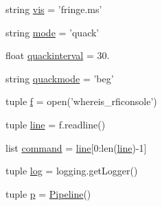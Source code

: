 \begin{DoxyCompactItemize}
\item 
string \hyperlink{namespacepipeline_a0c63f0078f780b925a9ff4e7152fd594}{vis} = 'fringe.\-ms'
\item 
string \hyperlink{namespacepipeline_ab3aedaf24061f05c06f13e3974bb528f}{mode} = 'quack'
\item 
float \hyperlink{namespacepipeline_a79d2ebe895f856da9610081a56d7d7b8}{quackinterval} = 30.
\item 
string \hyperlink{namespacepipeline_a7f4725d9856743ba5e6bf500e4e5ecb0}{quackmode} = 'beg'
\item 
tuple \hyperlink{namespacepipeline_a588e4fbfb4e0417f484202a3b99b6246}{f} = open('whereis\-\_\-rficonsole')
\item 
tuple \hyperlink{namespacepipeline_a4082c06691225d68a0ad3c6c56e73418}{line} = f.\-readline()
\item 
list \hyperlink{namespacepipeline_aba26565fe80f75bd4b4aaaad740095d6}{command} = \hyperlink{namespacepipeline_a4082c06691225d68a0ad3c6c56e73418}{line}\mbox{[}0\-:len(\hyperlink{namespacepipeline_a4082c06691225d68a0ad3c6c56e73418}{line})-\/1\mbox{]}
\item 
tuple \hyperlink{namespacepipeline_a82223a54352d8bd68ff34cec174a4c48}{log} = logging.\-get\-Logger()
\item 
tuple \hyperlink{namespacepipeline_af5fe35ff38e8f9792769a9dec62ec7f2}{p} = \hyperlink{classpipeline_1_1_pipeline}{\-Pipeline}()
\end{DoxyCompactItemize}


